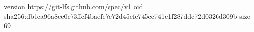 version https://git-lfs.github.com/spec/v1
oid sha256:db1ca96a8cc0c73ffcf4baefe7c72d45efc745cc741c1f287ddc72d0326d309b
size 69
